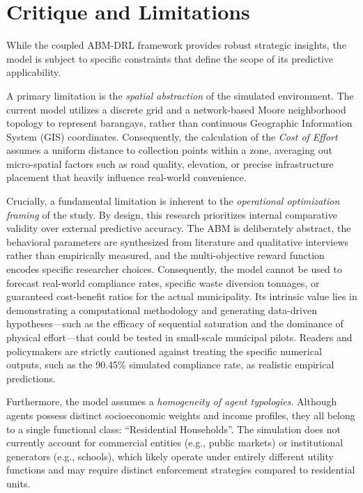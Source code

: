 \section{Critique and Limitations}
\setlength{\parindent}{2em}

While the coupled ABM-DRL framework provides robust strategic insights, the model is subject to specific constraints that define the scope of its predictive applicability.

A primary limitation is the \textit{spatial abstraction} of the simulated environment. The current model utilizes a discrete grid and a network-based Moore neighborhood topology to represent barangays, rather than continuous Geographic Information System (GIS) coordinates. Consequently, the calculation of the \textit{Cost of Effort} assumes a uniform distance to collection points within a zone, averaging out micro-spatial factors such as road quality, elevation, or precise infrastructure placement that heavily influence real-world convenience.

Crucially, a fundamental limitation is inherent to the \textit{operational optimization framing} of the study. By design, this research prioritizes internal comparative validity over external predictive accuracy. The ABM is deliberately abstract, the behavioral parameters are synthesized from literature and qualitative interviews rather than empirically measured, and the multi-objective reward function encodes specific researcher choices. Consequently, the model cannot be used to forecast real-world compliance rates, specific waste diversion tonnages, or guaranteed cost-benefit ratios for the actual municipality. Its intrinsic value lies in demonstrating a computational methodology and generating data-driven hypotheses—such as the efficacy of sequential saturation and the dominance of physical effort—that could be tested in small-scale municipal pilots. Readers and policymakers are strictly cautioned against treating the specific numerical outputs, such as the 90.45\% simulated compliance rate, as realistic empirical predictions.

Furthermore, the model assumes a \textit{homogeneity of agent typologies}. Although agents possess distinct socioeconomic weights and income profiles, they all belong to a single functional class: ``Residential Households''. The simulation does not currently account for commercial entities (e.g., public markets) or institutional generators (e.g., schools), which likely operate under entirely different utility functions and may require distinct enforcement strategies compared to residential units.

